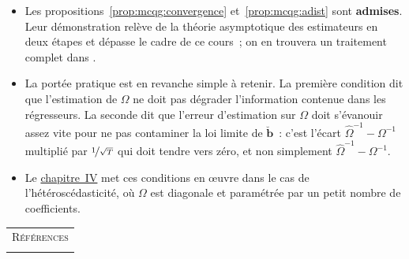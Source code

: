 \documentclass[10pt,a4paper]{article}
\newcommand{\siteurl}{https://le-mans.adjemian.eu/econometrics}
\newcommand{\chapref}[2]{\href{\siteurl/chapitre-#1.pdf}{chapitre~#2}}
\theoremstyle{definition}
\renewcommand{\newline}{\unskip\par\vspace{1.5pt}}
\begin{document}
\begin{notes}

  \begin{itemize}

  \item Les propositions~\ref{prop:mcqg:convergence} et~\ref{prop:mcqg:adist} sont
    \textbf{admises}. Leur démonstration relève de la théorie asymptotique des
    estimateurs en deux étapes et dépasse le cadre de ce cours~; on en trouvera un
    traitement complet dans \cite{Greene2017}.\newline

  \item La portée pratique est en revanche simple à retenir. La première condition dit
    que l'estimation de $\Omega$ ne doit pas dégrader l'information contenue dans les
    régresseurs. La seconde dit que l'erreur d'estimation sur $\Omega$ doit s'évanouir
    assez vite pour ne pas contaminer la loi limite de $\breve{\mathbf b}$~: c'est
    l'écart $\widehat\Omega^{-1}-\Omega^{-1}$ multiplié par $\nicefrac{1}{\sqrt T}$ qui
    doit tendre vers zéro, et non simplement $\widehat\Omega^{-1}-\Omega^{-1}$.\newline

  \item Le \chapref{4}{IV} met ces conditions en \oe uvre dans le cas de
    l'hétéroscédasticité, où $\Omega$ est diagonale et paramétrée par un petit nombre
    de coefficients.

  \end{itemize}

\end{notes}




\begin{notes}

  \begin{center}
    \begin{tabular}{c}
      \\
      \Huge{\textsc{Références}}\\
      \\
    \end{tabular}
  \end{center}

  \bigskip

  \nocite{Greene2017}

  \nocite{Schmidt1976}


\end{notes}
\end{document}
